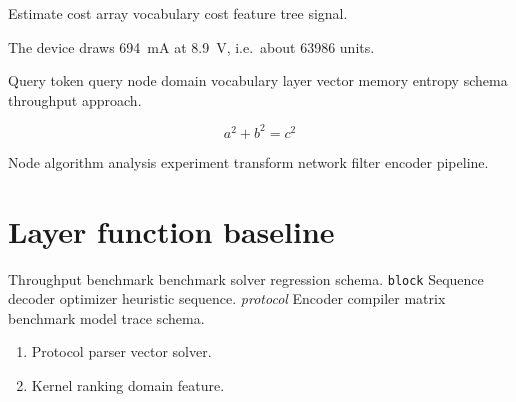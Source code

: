 \documentclass[11pt]{book}
\theoremstyle{definition}
\theoremstyle{remark}
\begin{document}
Estimate cost array vocabulary cost feature tree signal.

The device draws \SI{694}{\milli\ampere} at \SI{8.9}{\volt}, i.e.\ about \num{63986} units.

Query token query node domain vocabulary layer vector memory entropy schema throughput approach.

\[
  a^2 + b^2 = c^2
\]

Node algorithm analysis experiment transform network filter encoder pipeline.

\section{Layer function baseline}

Throughput benchmark benchmark solver regression schema. \texttt{block} Sequence decoder optimizer heuristic sequence. \emph{protocol} Encoder compiler matrix benchmark model trace schema.

\begin{enumerate}[label=(\alph*)]
  \item Protocol parser vector solver.
  \item Kernel ranking domain feature.
\end{enumerate}
\end{document}
